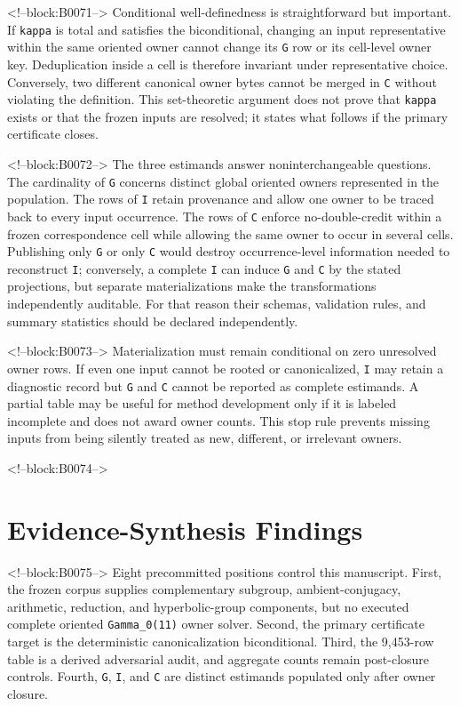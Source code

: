 \documentclass[11pt]{article}
\begin{document}
<!--block:B0071-->
Conditional well-definedness is straightforward but important. If
\texttt{kappa} is total and satisfies the biconditional, changing an
input representative within the same oriented owner cannot change its
\texttt{G} row or its cell-level owner key. Deduplication inside a cell
is therefore invariant under representative choice. Conversely, two
different canonical owner bytes cannot be merged in \texttt{C} without
violating the definition. This set-theoretic argument does not prove
that \texttt{kappa} exists or that the frozen inputs are resolved; it
states what follows if the primary certificate closes.

<!--block:B0072-->
The three estimands answer noninterchangeable questions. The cardinality
of \texttt{G} concerns distinct global oriented owners represented in
the population. The rows of \texttt{I} retain provenance and allow one
owner to be traced back to every input occurrence. The rows of
\texttt{C} enforce no-double-credit within a frozen correspondence cell
while allowing the same owner to occur in several cells. Publishing only
\texttt{G} or only \texttt{C} would destroy occurrence-level information
needed to reconstruct \texttt{I}; conversely, a complete \texttt{I} can
induce \texttt{G} and \texttt{C} by the stated projections, but separate
materializations make the transformations independently auditable. For
that reason their schemas, validation rules, and summary statistics
should be declared independently.

<!--block:B0073-->
Materialization must remain conditional on zero unresolved owner rows.
If even one input cannot be rooted or canonicalized, \texttt{I} may
retain a diagnostic record but \texttt{G} and \texttt{C} cannot be
reported as complete estimands. A partial table may be useful for method
development only if it is labeled incomplete and does not award owner
counts. This stop rule prevents missing inputs from being silently
treated as new, different, or irrelevant owners.

<!--block:B0074-->
\hypertarget{5-evidence-synthesis-findings}{%
\section{Evidence-Synthesis
Findings}\label{5-evidence-synthesis-findings}}

<!--block:B0075-->
Eight precommitted positions control this manuscript. First, the frozen
corpus supplies complementary subgroup, ambient-conjugacy, arithmetic,
reduction, and hyperbolic-group components, but no executed complete
oriented \texttt{Gamma\_0(11)} owner solver. Second, the primary
certificate target is the deterministic canonicalization biconditional.
Third, the 9,453-row table is a derived adversarial audit, and aggregate
counts remain post-closure controls. Fourth, \texttt{G}, \texttt{I}, and
\texttt{C} are distinct estimands populated only after owner closure.
\end{document}
